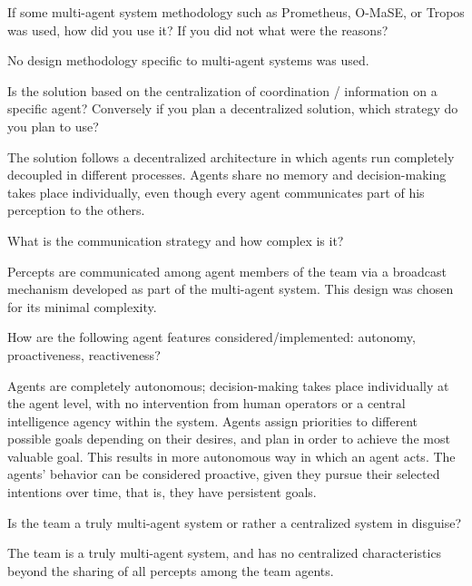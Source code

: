 \begin{question}
If some multi-agent system methodology such as Prometheus, O-MaSE, or Tropos was
used, how did you use it? If you did not what were the reasons?  
\end{question}

No design methodology specific to multi-agent systems was used. 

\begin{question}
Is the solution based on the centralization of coordination / information on
a specific agent? Conversely if you plan a decentralized solution, which
strategy do you plan to use?  
\end{question}

The solution follows a decentralized architecture in which agents run completely
decoupled in different processes. Agents share no memory and decision-making
takes place individually, even though every agent communicates part of his
perception to the others.

\begin{question}
What is the communication strategy and how complex is it?
\end{question}

Percepts are communicated among agent members of the team via a broadcast
mechanism developed as part of the multi-agent system. This design was chosen
for its minimal complexity.

\begin{question}
How are the following agent features considered/implemented: autonomy,
proactiveness, reactiveness?  
\end{question}

Agents are completely autonomous; decision-making takes place individually at
the agent level, with no intervention from human operators or a central
intelligence agency within the system. Agents assign priorities to different
possible goals depending on their desires, and plan in order to achieve the most
valuable goal. This results in more autonomous way in which an agent acts.  The
agents' behavior can be considered proactive, given they pursue their selected
intentions over time, that is, they have persistent goals.

\begin{question}
Is the team a truly multi-agent system or rather a centralized system in
disguise?  
\end{question}

The team is a truly multi-agent system, and has no centralized characteristics
beyond the sharing of all percepts among the team agents.

